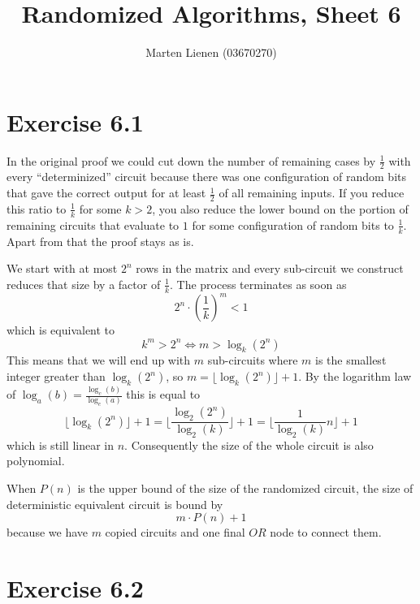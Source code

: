 \documentclass[10pt,a4paper]{article}
\title{Randomized Algorithms, Sheet 6}
\author{Marten Lienen (03670270)}
\begin{document}
\maketitle

\section*{Exercise 6.1}

In the original proof we could cut down the number of remaining cases by $\frac{1}{2}$ with every ``determinized'' circuit because there was one configuration of random bits that gave the correct output for at least $\frac{1}{2}$ of all remaining inputs.
If you reduce this ratio to $\frac{1}{k}$ for some $k > 2$, you also reduce the lower bound on the portion of remaining circuits that evaluate to $1$ for some configuration of random bits to $\frac{1}{k}$.
Apart from that the proof stays as is.

We start with at most $2^{n}$ rows in the matrix and every sub-circuit we construct reduces that size by a factor of $\frac{1}{k}$.
The process terminates as soon as
\begin{equation*}
  2^{n} \cdot \left( \frac{1}{k} \right)^{m} < 1
\end{equation*}
which is equivalent to
\begin{equation*}
  k^{m} > 2^{n} \Leftrightarrow m > \log_{k}\left( 2^{n} \right)
\end{equation*}
This means that we will end up with $m$ sub-circuits where $m$ is the smallest integer greater than $\log_{k}\left( 2^{n} \right)$, so $m = \lfloor \log_{k}\left( 2^{n} \right) \rfloor + 1$.
By the logarithm law of $\log_{a}(b) = \frac{\log_{c}(b)}{\log_{c}(a)}$ this is equal to
\begin{equation*}
  \lfloor \log_{k}\left( 2^{n} \right) \rfloor + 1 = \lfloor \frac{\log_{2}(2^{n})}{\log_{2}(k)} \rfloor + 1 = \lfloor \frac{1}{\log_{2}(k)}n \rfloor + 1
\end{equation*}
which is still linear in $n$.
Consequently the size of the whole circuit is also polynomial.

When $P(n)$ is the upper bound of the size of the randomized circuit, the size of deterministic equivalent circuit is bound by
\begin{equation*}
  m \cdot P(n) + 1
\end{equation*}
because we have $m$ copied circuits and one final $OR$ node to connect them.

\section*{Exercise 6.2}
\end{document}
